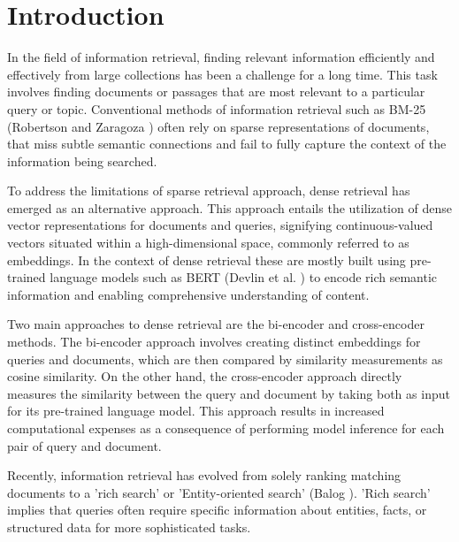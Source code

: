 \section{Introduction}\label{sec:introduction}

In the field of information retrieval, finding relevant information efficiently and effectively from large collections has been a challenge for a long time. This task involves finding documents or passages that are most relevant to a particular query or topic. Conventional methods of information retrieval such as BM-25 (Robertson and Zaragoza \cite{BM25}) often rely on sparse representations of documents, that miss subtle semantic connections and fail to fully capture the context of the information being searched.

To address the limitations of sparse retrieval approach, dense retrieval has emerged as an alternative approach. This approach entails the utilization of dense vector representations for documents and queries, signifying continuous-valued vectors situated within a high-dimensional space, commonly referred to as embeddings. In the context of dense retrieval these are mostly built using pre-trained language models such as BERT (Devlin et al. \cite{bert}) to encode rich semantic information and enabling comprehensive understanding of content. 

Two main approaches to dense retrieval are the bi-encoder and cross-encoder methods. The bi-encoder approach involves creating distinct embeddings for queries and documents, which are then compared by similarity measurements as cosine similarity. On the other hand, the cross-encoder approach directly measures the similarity between the query and document by taking both as input for its pre-trained language model. This approach results in increased computational expenses as a consequence of performing model inference for each pair of query and document.

Recently, information retrieval has evolved from solely ranking matching documents to a 'rich search' or 'Entity-oriented search' (Balog \cite{balog2018entity}). 'Rich search' implies that queries often require specific information about entities, facts, or structured data for more sophisticated tasks.


